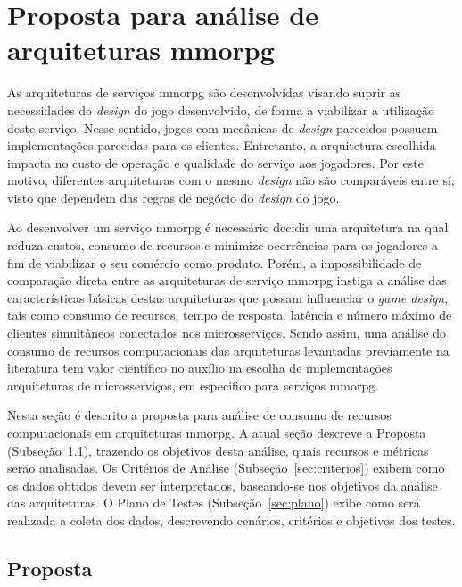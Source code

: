 \chapter{Proposta para análise de arquiteturas \ac{mmorpg}}
\label{cap3}



As arquiteturas de serviços \ac{mmorpg} são desenvolvidas visando suprir as necessidades do \textit{design} do jogo desenvolvido, de forma a viabilizar a utilização deste serviço.
%
Nesse sentido, jogos com mecânicas de \textit{design} parecidos possuem implementações parecidas para os clientes.
%
Entretanto, a arquitetura escolhida impacta no custo de operação e qualidade do serviço aos jogadores.
%
Por este motivo, diferentes arquiteturas com o mesmo \textit{design} não são comparáveis entre sí, visto que dependem das regras de negócio do \textit{design} do jogo.



Ao desenvolver um serviço \ac{mmorpg} é necessário decidir uma arquitetura na qual reduza custos, consumo de recursos e minimize ocorrências para os jogadores a fim de viabilizar o seu comércio como produto.
%
Porém, a impossibilidade de comparação direta entre as arquiteturas de serviço \ac{mmorpg} instiga a análise das características básicas destas arquiteturas que possam influenciar o \textit{game design}, tais como consumo de recursos, tempo de resposta, latência e número máximo de clientes simultâneos conectados nos microsserviços.
%
Sendo assim, uma análise do consumo de recursos computacionais das arquiteturas levantadas previamente na literatura tem valor científico no auxílio na escolha de implementações arquiteturas de microsserviços, em específico para serviços \ac{mmorpg}.



Nesta seção é descrito a proposta para análise de consumo de recursos computacionais em arquiteturas \ac{mmorpg}.
%
A atual seção descreve a Proposta (Subseção~\ref{sec:proposta}), trazendo os objetivos desta análise, quais recursos e métricas serão analisadas.
%
Os Critérios de Análise (Subseção~\ref{sec:criterios}) exibem como os dados obtidos devem ser interpretados, baseando-se nos objetivos da análise das arquiteturas.
%
O Plano de Testes (Subseção~\ref{sec:plano}) exibe como será realizada a coleta dos dados, descrevendo cenários, critérios e objetivos dos testes.



\section{Proposta}
\label{sec:proposta}

